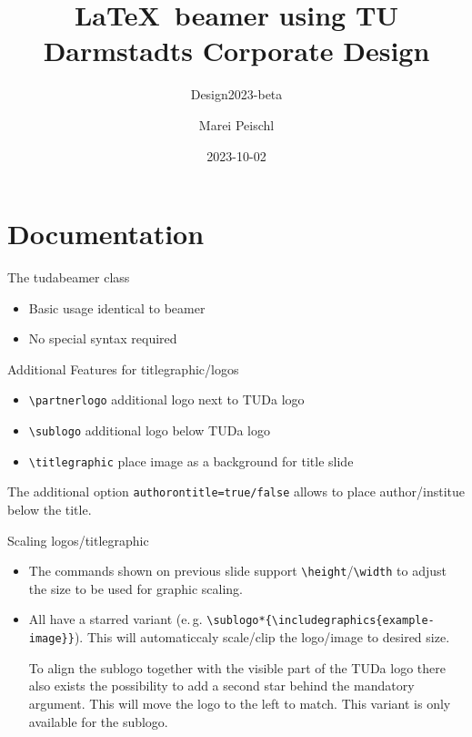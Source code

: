\documentclass[
	english, %
	design=2023, %
	]{tudabeamer}
\title[TUDaBeamer2023]{\LaTeX~beamer using TU Darmstadts Corporate Design}
\subtitle{Design2023-beta}
\author[M. Peischl]{Marei Peischl}
\institute{pei\TeX}
\date{2023-10-02}
\newcommand*{\code}[1]{\texttt{#1}}
\begin{document}
\maketitle

\tableofcontents

\section{Documentation}
\sectionpage

\begin{frame}{The tudabeamer class}
	\begin{itemize}
		\item Basic usage identical to beamer
		\item No special syntax required
	\end{itemize}
\end{frame}

\begin{frame}{Additional Features for titlegraphic/logos}
	\begin{itemize}
		\item \code{\textbackslash{}partnerlogo} additional logo next to TUDa logo
		\item \code{\textbackslash{}sublogo} additional logo below TUDa logo
		\item \code{\textbackslash{}titlegraphic} place image as a background for title slide
	\end{itemize}
	The additional option \code{authorontitle=true/false} allows to place author/institue below the title.
\end{frame}

\begin{frame}{Scaling logos/titlegraphic}
	\begin{itemize}
		\item The commands shown on previous slide support \code{\textbackslash{}height}/\code{\textbackslash{}width} to adjust the size to be used for graphic scaling.
		\item All have a starred variant (e.\,g. \code{\textbackslash{}sublogo*\{\textbackslash{}includegraphics\{example-image\}\}}). This will automaticcaly scale/clip the logo/image to desired size.

			To align the sublogo together with the visible part of the TUDa logo there also exists the possibility to add a second star behind the mandatory argument. This will move the logo to the left to match. This variant is only available for the sublogo.
	\end{itemize}
\end{frame}
\end{document}
